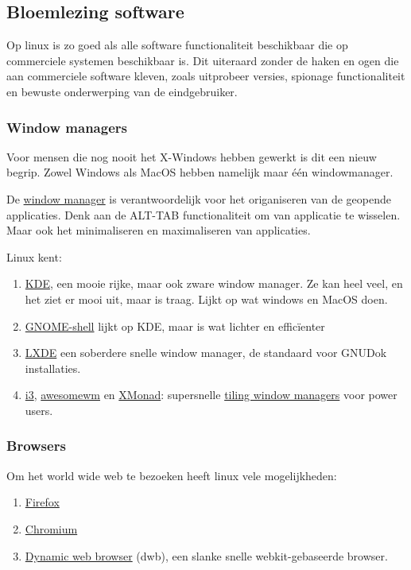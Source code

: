 \subsection{Bloemlezing software}
Op linux is zo goed als alle software functionaliteit beschikbaar die op commerciele systemen beschikbaar is. Dit uiteraard zonder de haken en ogen die aan commerciele software kleven, zoals uitprobeer versies, spionage functionaliteit en bewuste onderwerping van de eindgebruiker. 

\subsubsection{Window managers}
Voor mensen die nog nooit het X-Windows hebben gewerkt is dit een nieuw begrip. Zowel Windows als MacOS hebben namelijk maar \'{e}\'{e}n windowmanager. 

De \href{https://en.wikipedia.org/wiki/Window_manager}{window manager} is verantwoordelijk voor het origaniseren van de geopende applicaties. Denk aan de \textsc{ALT-TAB} functionaliteit om van applicatie te wisselen. Maar ook het minimaliseren en maximaliseren van applicaties.

Linux kent:

\begin{enumerate}
	\item \href{https://www.kde.org/}{KDE}, een mooie rijke, maar ook zware window manager. Ze kan heel veel, en het ziet er mooi uit, maar is traag. Lijkt op wat windows en MacOS doen.
	\item \href{http://www.gnome.org/}{GNOME-shell} lijkt op KDE, maar is wat lichter en effic\"{i}enter
	\item \href{http://lxde.org/}{LXDE} een soberdere snelle window manager, de standaard voor GNUDok installaties.
	\item \href{http://i3wm.org/}{i3}, \href{http://awesome.naquadah.org/}{awesomewm} en \href{http://xmonad.org/}{XMonad}: supersnelle \href{https://en.wikipedia.org/wiki/Tiling_window_manager}{tiling window managers} voor power users.
\end{enumerate}

\subsubsection{Browsers}
Om het world wide web te bezoeken heeft linux vele mogelijkheden:

\begin{enumerate}
	\item \href{https://www.mozilla.org/nl/firefox/new/}{Firefox}
	\item \href{http://www.chromium.org/}{Chromium}
	\item \href{http://portix.bitbucket.org/dwb/}{Dynamic web browser} (dwb), een slanke snelle webkit-gebaseerde browser.
\end{enumerate}

